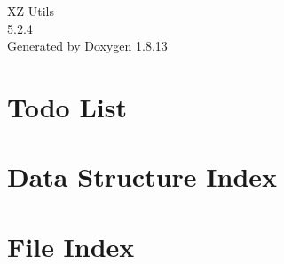 \documentclass[twoside]{book}
\newcommand{\+}{\discretionary{\mbox{\scriptsize$\hookleftarrow$}}{}{}}
\newcommand{\clearemptydoublepage}{%
  \newpage{\pagestyle{empty}\cleardoublepage}%
}
\begin{document}
\begin{titlepage}
\vspace*{7cm}
\begin{center}%
{\Large XZ Utils \\[1ex]\large 5.\+2.\+4 }\\
\vspace*{1cm}
{\large Generated by Doxygen 1.8.13}\\
\end{center}
\end{titlepage}
\clearemptydoublepage
{}
\tableofcontents
\clearemptydoublepage
{}

\chapter{Todo List}
\label{todo}

\chapter{Data Structure Index}

\chapter{File Index}

\end{document}
